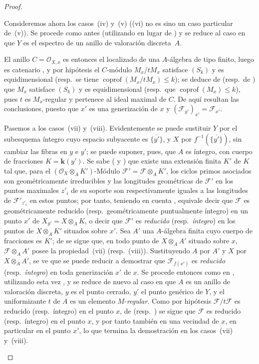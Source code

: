 \begin{proof}
\begin{env}[12.1.1.2]
\label{IV.12.1.1.2}
Consideremos ahora los casos~(iv) y~(v) ((vi) no es sino un caso particular de~(v)).
Se procede como antes (utilizando  en lugar de ) y se reduce al caso en que $Y$ es el espectro de un anillo de valoración discreta~$A$.

El anillo $C=\mathcal O_{X,x}$ es entonces el localizado de una $A$-álgebra de tipo finito, luego es catenario , y por hipótesis el $C$-módulo $M_x/tM_x$ satisface $(S_k)$ y es equidimensional (resp.\ se tiene $\operatorname{coprof}(M_x/tM_x)\leq k$); se deduce de  (resp.\ de ) que $M_x$ satisface $(S_k)$ y es equidimensional (resp.\ que $\operatorname{coprof}(M_x)\leq k$), pues $t$ es $M_x$-regular y pertenece al ideal maximal de $C$.
De aquí resultan las conclusiones, puesto que $x'$ es una generización de $x$ y $(\mathcal F_{y'})_{x'}=\mathcal F_{x'}$.
\end{env}

\begin{env}[12.1.1.3]
\label{IV.12.1.1.3}
Pasemos a los casos~(vii) y~(viii).
Evidentemente se puede sustituir $Y$ por el subesquema íntegro cuyo espacio subyacente es $\overline{\{y'\}}$, y $X$ por $f^{-1}(\overline{\{y'\}})$, sin cambiar las fibras en $y$ e $y'$; se puede suponer, pues, que $A$ es íntegro, con cuerpo de fracciones $K=\boldsymbol{k}(y')$.
Se sabe ( y ) que existe una extensión finita $K'$ de $K$ tal que, para el $(\mathcal O_X\otimes_AK')$-Módulo $\mathcal F'=\mathcal F\otimes_AK'$, los ciclos primos asociados son geométricamente irreducibles y las longitudes geométricas de $\mathcal F'$ en los puntos maximales $z'_i$ de su soporte son respectivamente iguales a las longitudes de $\mathcal F'_{z'_i}$ en estos puntos; por tanto, teniendo en cuenta , equivale decir que $\mathcal F$ es geométricamente reducido (resp.\ geométricamente puntualmente íntegro) en un punto $x'$ de $X_{y'}=X\otimes_AK$, o decir que $\mathcal F'$ es \emph{reducido} (resp.\ \emph{íntegro}) en los puntos de $X\otimes_AK'$ situados sobre $x'$.
Sea $A'$ una $A$-álgebra finita cuyo cuerpo de fracciones es $K'$; de  se sigue que, en todo punto de $X\otimes_AA'$ situado sobre $x$, $\mathcal F\otimes_AA'$ posee la propiedad~(vii) (resp.~(viii)).
Sustituyendo $A$ por $A'$ y $X$ por $X\otimes_AA'$, se ve que se puede reducir a demostrar que $\mathcal F_{f(x')}$ es \emph{reducido} (resp.\ \emph{íntegro}) en toda generización $x'$ de $x$.
Se procede entonces como en , utilizando esta vez , y se reduce de nuevo al caso en que $A$ es un anillo de valoración discreta, $y$ es el punto cerrado, $y'$ el punto genérico de $Y$, y el uniformizante $t$ de $A$ es un elemento $M$-\emph{regular}.
Como por hipótesis $\mathcal F/t\mathcal F$ es reducido (resp.\ íntegro) en el punto $x$, de  (resp.\ ) se sigue que $\mathcal F$ es reducido (resp.\ íntegro) en el punto $x$, y por tanto también en una vecindad de $x$, en particular en el punto $x'$, lo que termina la demostración en los casos~(vii) y~(viii).
\end{env}


\end{proof}
